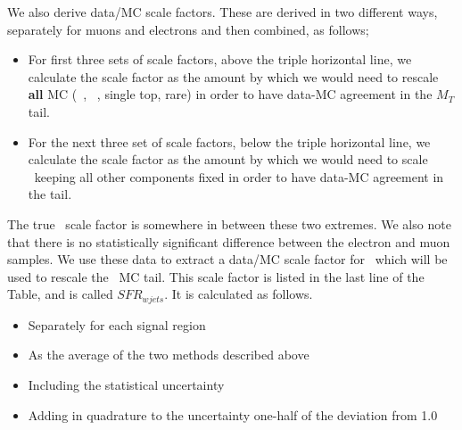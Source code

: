 We also derive data/MC scale factors.
These are derived in two different ways, separately for muons and
electrons and then combined, as follows;
\begin{itemize}
\item For first three sets of scale factors, above the triple horizontal
  line, we calculate the scale factor as the amount by which we would
  need to rescale {\bf all} MC (\wjets\ , \ttbar\ , single top, rare) in
  order to have data-MC agreement in the $M_T$ tail.
\item For the next three set of scale factors, below the triple horizontal
line, we calculate the scale factor as the amount by which we would
need 
to scale \wjets\ keeping all other 
components fixed in order to have data-MC agreement in the tail.
\end{itemize}
\noindent  The true \wjets\ scale factor is somewhere in between these
two extremes.  We also note that there is no statistically significant
difference between the electron and muon samples.  We use these data
to extract a data/MC scale factor for \wjets\ which will be used to
rescale the \wjets\ MC tail.  This scale factor is listed in the last
line of the Table, and is called $SFR_{wjets}$.  It is calculated as
follows.
\begin{itemize}
\item Separately for each signal region
\item As the average of the two methods described above
\item Including the statistical uncertainty
\item Adding in quadrature to the uncertainty one-half of the
  deviation from 1.0
\end{itemize}

 




